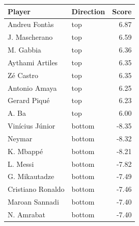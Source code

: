 
\begin{tabular}{llr}
\toprule
Player & Direction & Score\\
\midrule
Andreu Fontàs & top & 6.87\\
J. Mascherano & top & 6.59\\
M. Gabbia & top & 6.36\\
Aythami Artiles & top & 6.35\\
Zé Castro & top & 6.35\\
Antonio Amaya & top & 6.25\\
Gerard Piqué & top & 6.23\\
A. Ba & top & 6.00\\
Vinícius Júnior & bottom & -8.35\\
Neymar & bottom & -8.32\\
K. Mbappé & bottom & -8.21\\
L. Messi & bottom & -7.82\\
G. Mikautadze & bottom & -7.49\\
Cristiano Ronaldo & bottom & -7.46\\
Maroan Sannadi & bottom & -7.40\\
N. Amrabat & bottom & -7.40\\
\bottomrule
\end{tabular}
